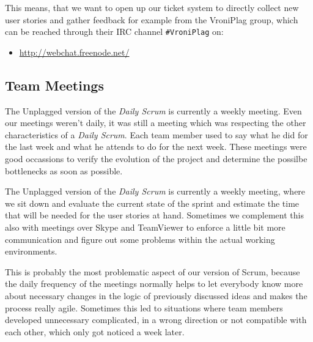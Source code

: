 This means, that we want to open up our ticket system to directly collect new user stories and gather feedback for 
example from the VroniPlag group, which can be reached through their IRC channel \texttt{\#VroniPlag} on:

\begin{itemize}
\item \url{http://webchat.freenode.net/}
\end{itemize} 


\subsection{Team Meetings}

The Unplagged version of the \textit{Daily Scrum} is currently a weekly meeting. Even our meetings weren't daily, it was still a meeting which was respecting the other characteristics of a \textit{Daily Scrum}. Each team member used to say what he did for the last week and what he attends to do for the next week. These meetings were good occassions to verify the evolution of the project and determine the possilbe bottlenecks as soon as possible. 

The Unplagged version of the \textit{Daily Scrum} is currently a weekly meeting, where we sit down
and evaluate the current state of the sprint and estimate the time that will be needed for the user stories at hand.
Sometimes we complement this also with meetings over Skype and TeamViewer to enforce a little bit more communication and 
figure out some problems within the actual working environments.

This is probably the most problematic aspect of our version of Scrum, because the daily frequency of the meetings normally 
helps to let everybody know more about necessary changes in the logic of previously discussed ideas and makes the process
really agile. Sometimes this led to situations where team members developed unnecessary complicated, in a wrong direction
or not compatible with each other, which only got noticed a week later.

